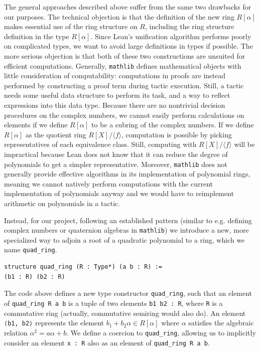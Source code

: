 \documentclass[sigplan,10pt,nonacm,
screen]{acmart} \settopmatter{printfolios=true,printccs=false,printacmref=false}
\newcommand{\mathlib}{\lstinline{mathlib}\xspace}
\begin{document}
    The general approaches described above suffer from the same two drawbacks for our purposes.
    The technical objection is that the definition of the new ring $R[\alpha]$ makes essential use of the ring structure on $R$, including the ring structure definition in the type $R[\alpha]$.
    Since Lean's unification algorithm performs poorly on complicated types, we want to avoid large definitions in types if possible.
    The more serious objection is that both of these two constructions are unsuited for efficient computations.
    Generally, \mathlib defines mathematical objects with little consideration of computability: computations in proofs are instead performed by constructing a proof term during tactic execution.
    Still, a tactic needs some useful data structure to perform its task, and a way to reflect expressions into this data type.
    Because there are no nontrivial decision procedures on the complex numbers, we cannot easily perform calculations on elements if we define $R[\alpha]$ to be a subring of the complex numbers.
    If we define $R[\alpha]$ as the quotient ring $R[X] / \langle f \rangle$, computation is possible by picking representatives of each equivalence class.
    Still, computing with $R[X] / \langle f\rangle$ will be impractical because Lean does not know that it can reduce the degree of polynomials to get a simpler representative.
    Moreover, \mathlib does not generally provide effective algorithms in its implementation of polynomial rings,
    meaning we cannot natively perform computations with the current implementation of polynomials anyway
    and we would have to reimplement arithmetic on polynomials in a tactic.

    Instead, for our project, following an established pattern (similar to e.g. defining complex numbers or quaternion algebras in \mathlib) we introduce a new, more specialized way to adjoin a root of a quadratic polynomial to a ring, which we name \lstinline{quad_ring}.
\begin{lstlisting}
structure quad_ring (R : Type*) (a b : R) :=
(b1 : R) (b2 : R)
\end{lstlisting}
    The code above defines a new type constructor \lstinline{quad_ring},
    such that an element of \lstinline{quad_ring R a b} is a tuple of two elements \lstinline{b1 b2 : R}, where \lstinline{R} is a commutative ring (actually, commutative semiring would also do).
    An element \lstinline{⟨b1, b2⟩} represents the element $b_1 + b_2 \alpha \in R[\alpha]$ where $\alpha$ satisfies the algebraic relation $\alpha^2=a\alpha+b$.
    We define a coercion to \lstinline{quad_ring},
    allowing us to implicitly consider an element \lstinline{x : R} also as an element of \lstinline{quad_ring R a b}.
\end{document}
